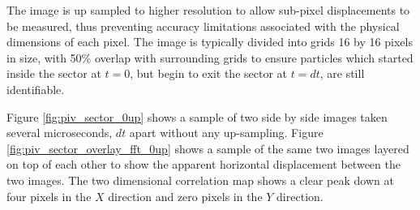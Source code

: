 The image is 
up sampled to higher resolution to allow sub-pixel displacements to be 
measured, thus preventing accuracy limitations associated with the physical 
dimensions of each pixel. The image is typically divided into grids 16 by 16 
pixels in size, with 50\% overlap with surrounding grids to ensure particles 
which started inside the sector at $t=0$, but begin to exit the sector at 
$t=dt$, are still identifiable.  


Figure \ref{fig:piv_sector_0up} shows a sample of two side by side images taken 
several microseconds, $dt$ apart without any up-sampling. Figure 
\ref{fig:piv_sector_overlay_fft_0up} shows a sample of the same two images 
layered on top of each other to show the apparent horizontal displacement 
between the two images. The two dimensional correlation map shows a clear peak 
down at four pixels in the $X$ direction and zero pixels in the $Y$ direction.



